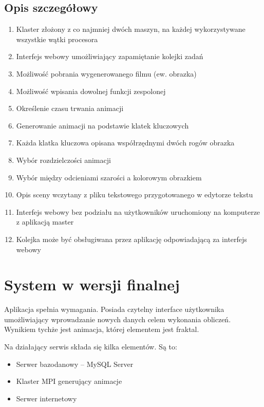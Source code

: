 \documentclass[a4paper]{article}
\begin{document}
\subsection{Opis szczegółowy}
\begin{enumerate}
\item Klaster złożony z co najmniej dwóch maszyn, na każdej wykorzystywane wszystkie wątki procesora
\item Interfejs webowy umożliwiający zapamiętanie kolejki zadań
\item Możliwość pobrania wygenerowanego filmu (ew. obrazka)
\item Możliwość wpisania dowolnej funkcji zespolonej
\item Określenie czasu trwania animacji
\item Generowanie animacji na podstawie klatek kluczowych
\item Każda klatka kluczowa opisana współrzędnymi dwóch rogów obrazka
\item Wybór rozdzielczości animacji
\item Wybór między odcieniami szarości a kolorowym obrazkiem
\item Opis sceny wczytany z pliku tekstowego przygotowanego  w edytorze tekstu
\item Interfejs webowy bez podziału na użytkowników uruchomiony na komputerze z aplikacją master
\item Kolejka może być obsługiwana przez aplikację odpowiadającą za interfejs webowy
\end{enumerate}
\newpage

\section{System w wersji finalnej}
Aplikacja spełnia wymagania. Posiada czytelny interface użytkownika umożliwiający wprowadzanie nowych danych celem wykonania obliczeń. Wynikiem tychże jest animacja, której elementem jest fraktal. 
\par
Na działający serwis składa się kilka elementów. Są to:
\begin{itemize}
\item Serwer bazodanowy -- MySQL Server
\item Klaster MPI generujący animacje
\item Serwer internetowy
\end{itemize}
\end{document}
